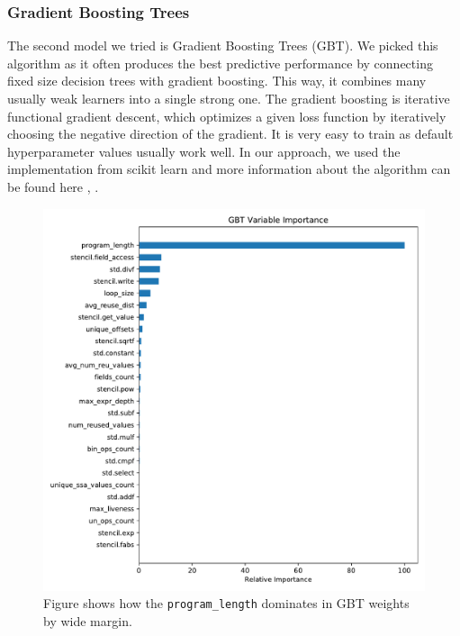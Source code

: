 \documentclass[sigplan,\review anonymous]{acmart}
\begin{document}
\subsubsection{Gradient Boosting Trees}

The second model we tried is Gradient Boosting Trees (GBT). We picked this
algorithm as it often produces the best predictive performance by connecting
fixed size decision trees with gradient boosting. This way, it combines many
usually weak learners into a single strong one. The gradient boosting is
iterative functional gradient descent, which optimizes a given loss function
by iteratively choosing the negative direction of the gradient.  It is very
easy to train as default hyperparameter values usually work well. In our
approach, we used the implementation from scikit learn \cite{scikit_gbt} and
more information about the algorithm can be found here \cite{friedman2001},
\cite{wiki_gbt}.

\begin{figure}
  \centering
  \includegraphics[width=\columnwidth]{images/gbt_var_importance.pdf}
  \caption{Figure shows how the \texttt{program\_length} dominates in GBT
  weights by wide margin.}
  \label{fig:gbt_var_importance}
\end{figure}
\end{document}
